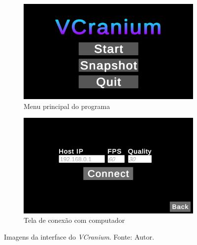 
\begin{figure}[ht]
    \centering
        \begin{subfigure}{.45\textwidth}
            \centering
            \includegraphics[width=.95\linewidth]{figuras/vcranium_main.png}
            \caption{Menu principal do programa}
            \label{fig:vcranium-connect}
        \end{subfigure}
        \begin{subfigure}{.45\textwidth}
            \centering
            \includegraphics[width=.95\linewidth]{figuras/vcranium_connect.png}
            \caption{Tela de conexão com computador}
            \label{fig:vcranium2-connect}
        \end{subfigure}
        \caption{Imagens da interface do \textit{VCranium}. Fonte: Autor.}
        \label{fig:ui1}
\end{figure}




